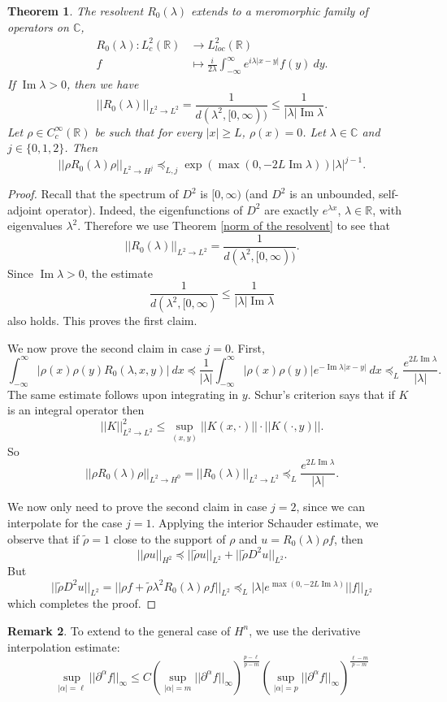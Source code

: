\documentclass[12pt]{report}
\newcommand{\RR}{\mathbb{R}}
\newcommand{\CC}{\mathbb{C}}
\renewcommand{\Im}{\operatorname{Im}}
\newtheorem{theorem}{Theorem}[chapter]
\theoremstyle{definition}
\newtheorem{remark}[theorem]{Remark}
\begin{document}
\begin{theorem}
The resolvent $R_0(\lambda)$ extends to a meromorphic family of operators on $\CC$,
\begin{align*}
    R_0(\lambda): L^2_c(\RR) &\to L^2_{loc}(\RR)\\
    f &\mapsto \frac{i}{2\lambda} \int_{-\infty}^\infty e^{i\lambda|x-y|} f(y)~dy.
\end{align*}
If $\Im \lambda > 0$, then we have
$$||R_0(\lambda)||_{L^2 \to L^2} = \frac{1}{d(\lambda^2, [0, \infty))} \leq \frac{1}{|\lambda| \Im \lambda}.$$
Let $\rho \in C^\infty_c(\RR)$ be such that for every $|x| \geq L$, $\rho(x) = 0$. Let $\lambda \in \CC$ and $j \in \{0, 1, 2\}$. Then
$$||\rho R_0(\lambda)\rho||_{L^2 \to H^j} \preceq_{L,j} \exp(\max(0, -2L \Im \lambda)) |\lambda|^{j-1}.$$
\end{theorem}
\begin{proof}
Recall that the spectrum of $D^2$ is $[0, \infty)$ (and $D^2$ is an unbounded, self-adjoint operator). Indeed, the eigenfunctions of $D^2$ are exactly $e^{\lambda x}$, $\lambda \in \RR$, with eigenvalues $\lambda^2$. Therefore we use Theorem \ref{norm of the resolvent} to see that
$$||R_0(\lambda)||_{L^2 \to L^2} = \frac{1}{d(\lambda^2, [0, \infty))}.$$
Since $\Im \lambda > 0$, the estimate
$$\frac{1}{d(\lambda^2, [0, \infty)} \leq \frac{1}{|\lambda| \Im \lambda}$$
also holds. This proves the first claim.

We now prove the second claim in case $j = 0$. First, 
$$\int_{-\infty}^\infty |\rho(x)\rho(y)R_0(\lambda, x, y)| ~dx \preceq \frac{1}{|\lambda|} \int_{-\infty}^\infty |\rho(x)\rho(y)| e^{-\Im \lambda|x-y|} ~dx \preceq_L \frac{e^{2L\Im \lambda}}{|\lambda|}.$$
The same estimate follows upon integrating in $y$. Schur's criterion says that if $K$ is an integral operator then
$$||K||_{L^2 \to L^2}^2 \leq \sup_{(x, y)} ||K(x, \cdot)|| \cdot ||K(\cdot, y)||.$$
So
$$||\rho R_0(\lambda)\rho||_{L^2 \to H^0} = ||R_0(\lambda)||_{L^2 \to L^2} \preceq_L \frac{e^{2L \Im \lambda}}{|\lambda|}.$$

We now only need to prove the second claim in case $j = 2$, since we can interpolate for the case $j = 1$. Applying the interior Schauder estimate, we observe that if $\tilde \rho = 1$ close to the support of $\rho$ and $u = R_0(\lambda)\rho f$, then
$$||\rho u||_{H^2} \preceq ||\tilde \rho u||_{L^2} + ||\tilde \rho D^2u||_{L^2}.$$
But
$$||\tilde \rho D^2u||_{L^2} = ||\rho f + \tilde \rho \lambda^2 R_0(\lambda) \rho f||_{L^2} \preceq_L |\lambda| e^{\max(0, -2L \Im \lambda)}||f||_{L^2}$$
which completes the proof.
\end{proof}
\begin{remark}
To extend to the general case of $H^n$, we use the derivative interpolation estimate:
$$\sup_{|\alpha| = \ell} ||\partial^\alpha f||_\infty \le C\left(\sup_{|\alpha| = m} ||\partial^\alpha f||_\infty \right)^{\frac{p - \ell}{p - m}}\left(\sup_{|\alpha| = p} ||\partial^\alpha f||_\infty \right)^{\frac{\ell - m}{p - m}}$$
\end{remark}
\end{document}
